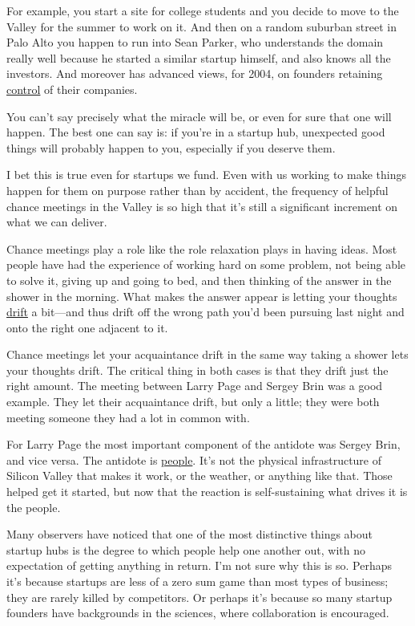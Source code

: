 \documentclass[12pt]{book}
\begin{document}
For example, you start a site for college students and you decide to
move to the Valley for the summer to work on it. And then on a random
suburban street in Palo Alto you happen to run into Sean Parker, who
understands the domain really well because he started a similar startup
himself, and also knows all the investors. And moreover has advanced
views, for 2004, on founders retaining \href{control.html}{control} of
their companies.

You can't say precisely what the miracle will be, or even for sure that
one will happen. The best one can say is: if you're in a startup hub,
unexpected good things will probably happen to you, especially if you
deserve them.

I bet this is true even for startups we fund. Even with us working to
make things happen for them on purpose rather than by accident, the
frequency of helpful chance meetings in the Valley is so high that it's
still a significant increment on what we can deliver.

Chance meetings play a role like the role relaxation plays in having
ideas. Most people have had the experience of working hard on some
problem, not being able to solve it, giving up and going to bed, and
then thinking of the answer in the shower in the morning. What makes the
answer appear is letting your thoughts \href{top.html}{drift} a
bit---and thus drift off the wrong path you'd been pursuing last night
and onto the right one adjacent to it.

Chance meetings let your acquaintance drift in the same way taking a
shower lets your thoughts drift. The critical thing in both cases is
that they drift just the right amount. The meeting between Larry Page
and Sergey Brin was a good example. They let their acquaintance drift,
but only a little; they were both meeting someone they had a lot in
common with.

For Larry Page the most important component of the antidote was Sergey
Brin, and vice versa. The antidote is \href{siliconvalley.html}{people}.
It's not the physical infrastructure of Silicon Valley that makes it
work, or the weather, or anything like that. Those helped get it
started, but now that the reaction is self-sustaining what drives it is
the people.

Many observers have noticed that one of the most distinctive things
about startup hubs is the degree to which people help one another out,
with no expectation of getting anything in return. I'm not sure why this
is so. Perhaps it's because startups are less of a zero sum game than
most types of business; they are rarely killed by competitors. Or
perhaps it's because so many startup founders have backgrounds in the
sciences, where collaboration is encouraged.
\end{document}
